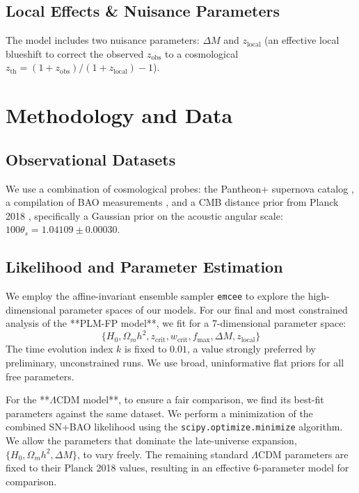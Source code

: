 \documentclass[12pt, a4paper]{article}
\begin{document}
\subsection{Local Effects \& Nuisance Parameters}
The model includes two nuisance parameters: $\Delta M$ and $z_{\text{local}}$ (an effective local blueshift to correct the observed $z_{\text{obs}}$ to a cosmological $z_{\text{th}} = (1 + z_{\text{obs}}) / (1 + z_{\text{local}}) - 1$).

\section{Methodology and Data}
\subsection{Observational Datasets}
We use a combination of cosmological probes: the Pantheon+ supernova catalog \cite{PantheonPlus}, a compilation of BAO measurements \cite{BAO_compilation}, and a CMB distance prior from Planck 2018 \cite{Planck2018}, specifically a Gaussian prior on the acoustic angular scale: $100 \theta_s = 1.04109 \pm 0.00030$.

\subsection{Likelihood and Parameter Estimation}
We employ the affine-invariant ensemble sampler \texttt{emcee} \cite{emcee} to explore the high-dimensional parameter spaces of our models. For our final and most constrained analysis of the **PLM-FP model**, we fit for a 7-dimensional parameter space:
$$ \{H_0, \Omega_m h^2, z_{\text{crit}}, w_{\text{crit}}, f_{\max}, \Delta M, z_{\text{local}}\} $$
The time evolution index $k$ is fixed to $0.01$, a value strongly preferred by preliminary, unconstrained runs. We use broad, uninformative flat priors for all free parameters.

For the **$\Lambda$CDM model**, to ensure a fair comparison, we find its best-fit parameters against the same dataset. We perform a minimization of the combined SN+BAO likelihood using the \texttt{scipy.optimize.minimize} algorithm. We allow the parameters that dominate the late-universe expansion, $\{H_0, \Omega_m h^2, \Delta M\}$, to vary freely. The remaining standard $\Lambda$CDM parameters are fixed to their Planck 2018 values, resulting in an effective 6-parameter model for comparison.
\end{document}
